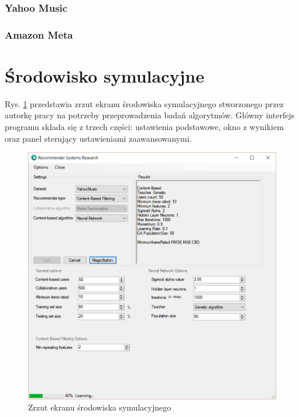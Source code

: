 \documentclass[twoside]{iisthesis}
\begin{document}
		\subsubsection{Yahoo Music}
		
		
		\subsubsection{Amazon Meta}
		
		
			\cite{leskovec2007dynamics}
		
	\section{Środowisko symulacyjne}
	
		Rys. \ref{fig:program} przedstawia zrzut ekranu środowiska symulacyjnego stworzonego przez autorkę pracy na potrzeby przeprowadzenia badań algorytmów. Główny interfejs programu składa się z trzech części: ustawienia podstawowe, okno z wynikiem oraz panel sterujący ustawieniami zaawansowanymi. 
	
		\begin{figure}[!ht] 
			\centering
			\includegraphics[width=1\textwidth]{program}
			\caption{Zrzut ekranu środowiska symulacyjnego}
			\label{fig:program}
		\end{figure}
	
\end{document}

